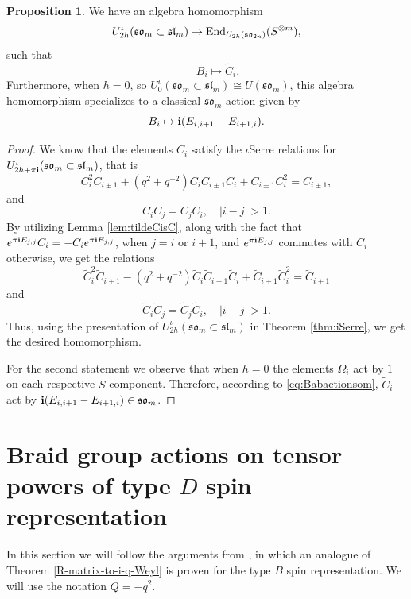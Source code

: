 \documentclass[10pt]{amsart}
\numberwithin{equation}{section}
\theoremstyle{definition}
\newtheorem{proposition}[theorem]{Proposition}
\newcommand{\End}{{\rm End}}
\newcommand{\slm}{\mathfrak{sl}_{m}}
\newcommand{\son}[1][2n]{\mathfrak{so}_{#1}}
\newcommand{\som}[1][m]{\mathfrak{so}_{#1}}
\newcommand{\ot}{\otimes}
\begin{document}
\begin{proposition}\label{sign_switch}
    We have an algebra homomorphism 
    \[
    U^{\iota}_{2h}(\som \subset \slm) \rightarrow \End_{U_{2h}(\son)}(S^{\ot m}),
    \]
    such that
    \[
    \qquad B_i \mapsto \widetilde{C}_i.
    \]
    Furthermore, when $h=0$, so $U^{\iota}_{0}(\som \subset \slm) \cong U(\som)$, this algebra homomorphism specializes to a classical $\som$ action given by
    \[
    B_i \mapsto {\bf i}(E_{i,i+1}-E_{i+1,i}).
    \]
\end{proposition}
\begin{proof}
    We know that the elements $C_i$ satisfy the $\iota$Serre relations for $U^{\iota}_{2h+\pi {\bf i}}(\som \subset \slm)$, that is
    \[
    C_{i}^2 C_{i\pm 1}+(q^2+q^{-2})C_i C_{i\pm 1} C_{i}+C_{i\pm 1}C_i^2=C_{i\pm 1},
    \]
    and
    \[
    C_iC_j=C_jC_i, \quad |i-j|>1.
    \]
    By utilizing Lemma \ref{lem:tildeCisC}, along with the fact that $e^{\pi {\bf i} E_{j,j}} C_{i}=-C_{i}e^{\pi {\bf i} E_{j,j}}$, when $j=i$ or $i+1$, and $e^{\pi {\bf i} E_{j,j}}$ commutes with $C_i$ otherwise, we get the relations
    \[
    \widetilde{C}_i^{2}\widetilde{C}_{i\pm 1}-(q^2+q^{-2})\widetilde{C}_i \widetilde{C}_{i\pm 1} \widetilde{C}_i + \widetilde{C}_{i\pm 1}\widetilde{C}_i^2= \widetilde{C}_{i\pm 1}
    \]
    and
    \[
    \widetilde{C}_i\widetilde{C}_j=\widetilde{C}_j\widetilde{C}_i, \quad |i-j|>1.
    \]
    Thus, using the presentation of $U_{2h}^{\iota}(\som\subset \slm)$ in Theorem \ref{thm:iSerre}, we get the desired homomorphism. 
    
    For the second statement we observe that when $h=0$ the elements $\Omega_i$ act by $1$ on each respective $S$ component. Therefore, according to \eqref{eq:Babactionsom}, $\widetilde{C}_i$ act by ${\bf i} (E_{i,i+1}-E_{i+1,i})\in \som$.
\end{proof}



%
\section{Braid group actions on tensor powers of type $D$ spin representation}\label{sec6}
%

 In this section we will follow the arguments from \cite[Section 4]{BER}, in which an analogue of Theorem \ref{R-matrix-to-i-q-Weyl} is proven for the type $B$ spin representation. We will use the notation $Q=-q^2$.
\end{document}
